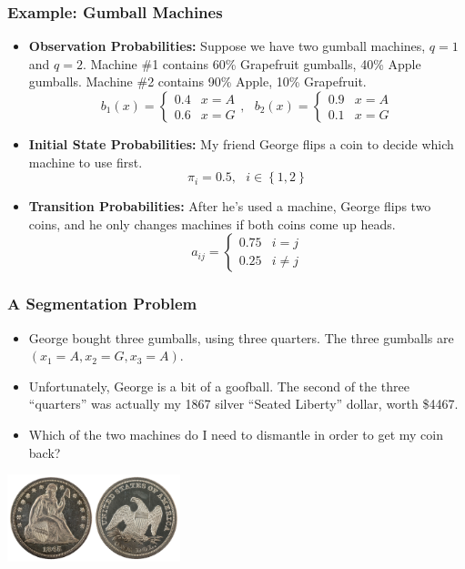 \documentclass{beamer}
\begin{document}
\begin{frame}
  \frametitle{Example: Gumball Machines}
  \begin{itemize}
  \item {\bf Observation Probabilities:} Suppose we have two gumball
    machines, $q=1$ and $q=2$.  Machine \#1 contains 60\% Grapefruit
    gumballs, 40\% Apple gumballs.  Machine \#2 contains 90\%
    Apple, 10\% Grapefruit.
    \[
    b_1(x)=\begin{cases} 0.4 & x=A\\0.6 & x=G\end{cases},~~~
    b_2(x)=\begin{cases} 0.9 & x=A\\0.1 & x=G\end{cases}
    \]
  \item {\bf Initial State Probabilities:} My friend George flips a
    coin to decide which machine to use first.
    \[
    \pi_i = 0.5,~~~i\in\left\{1,2\right\}
    \]
  \item {\bf Transition Probabilities:} After he's used a machine,
    George flips two coins, and he only changes machines if both coins
    come up heads.
    \[
    a_{ij}=\begin{cases} 0.75 & i=j\\0.25 & i\ne j\end{cases}
    \]
  \end{itemize}
\end{frame}

\begin{frame}
  \frametitle{A Segmentation Problem}

  \begin{itemize}
  \item George bought three gumballs, using three quarters.  The three
    gumballs are $(x_1=A,x_2=G,x_3=A)$.
  \item Unfortunately, George is a bit of a goofball.  The second of
    the three ``quarters'' was actually my 1867 silver ``Seated
    Liberty'' dollar, worth \$4467.
  \item Which of the two machines do I need to dismantle in order to
    get my coin back?
  \end{itemize}
  \centerline{\includegraphics[height=1in]{seatedlibertydollar.jpg}}
\end{frame}
\end{document}

